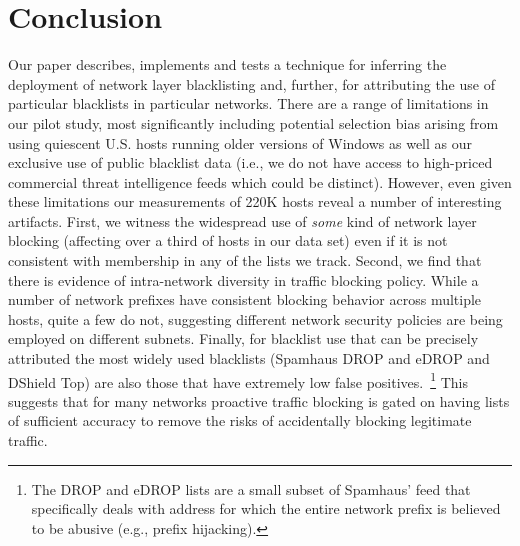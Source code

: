 \section{Conclusion}
Our paper describes, implements and tests a technique for inferring
the deployment of network layer blacklisting and, further, for
attributing the use of particular blacklists in particular networks.
There are a range of limitations in our pilot study, most
significantly including potential selection bias arising from using
quiescent U.S. hosts running older versions of Windows as well as our
exclusive use of public blacklist data (i.e., we do not have access to
high-priced commercial threat intelligence feeds which could be
distinct).  However, even given these limitations our measurements of
220K hosts reveal a number of interesting artifacts.  First, we
witness the widespread use of \emph{some} kind of network layer
blocking (affecting over a third of hosts in our data set) even if it
is not consistent with membership in any of the lists we track.
Second, we find that there is evidence of intra-network diversity in
traffic blocking policy.  While a number of network prefixes have
consistent blocking behavior across multiple hosts, quite a few do
not, suggesting different network security policies are being employed
on different subnets.  Finally, for blacklist use that can be
precisely attributed the most widely used blacklists (Spamhaus DROP
and eDROP and DShield Top) are also those that have extremely low
false positives.~\footnote{The DROP and eDROP lists are a small subset
  of Spamhaus' feed that specifically deals with address for which the
  entire network prefix is believed to be abusive (e.g., prefix
  hijacking).} This suggests that for many networks proactive traffic
  blocking is gated on having lists of sufficient accuracy to remove
  the risks of accidentally blocking legitimate traffic.
